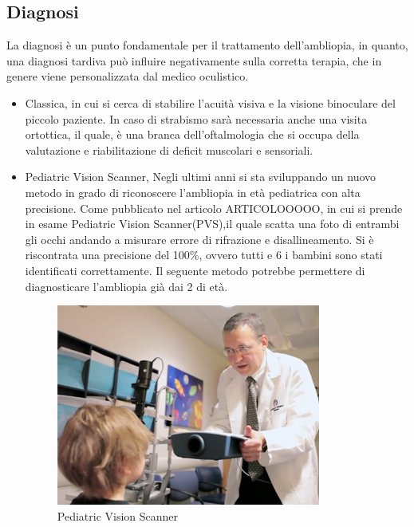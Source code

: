 \documentclass[10pt,a4paper]{article}
\begin{document}
	\subsection{Diagnosi}
	La diagnosi è un punto fondamentale per il trattamento dell'ambliopia, in quanto, una diagnosi tardiva può influire negativamente sulla corretta terapia, che in genere viene personalizzata dal medico oculistico. 
	\begin{itemize}
		\item Classica, in cui si cerca di stabilire l'acuità visiva e la visione binoculare del piccolo paziente. In caso di strabismo sarà necessaria anche una visita ortottica, il quale, è una branca dell'oftalmologia che si occupa della valutazione e riabilitazione di deficit muscolari e sensoriali.
		\item Pediatric Vision Scanner, Negli ultimi anni si sta sviluppando un nuovo metodo in grado di riconoscere l'ambliopia in età pediatrica con alta precisione.
		Come pubblicato nel articolo 	ARTICOLOOOOO, in cui si prende in esame Pediatric Vision Scanner(PVS),il quale scatta una foto di entrambi gli occhi andando a misurare errore di rifrazione e disallineamento.
		Si è riscontrata una precisione del 100\%, ovvero tutti e 6 i bambini sono stati identificati correttamente.
		Il seguente metodo potrebbe permettere di diagnosticare l'ambliopia già dai 2 di età.
		\begin{figure}[h]
			\centering
			\includegraphics[width=0.6\linewidth]{image/pvs}
			\caption{Pediatric Vision Scanner}
			\label{fig:pvs}
		\end{figure}
	\end{itemize}
\end{document}
